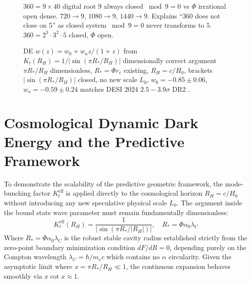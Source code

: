 \documentclass[11pt,a4paper]{article}
\begin{document}
\begin{figure}[H]\centering{}\caption{$360=9\times40$ digital root $9$ always closed $\bmod9=0$ vs $\Phi$ irrational open dense. $720\to9$, $1080\to9$, $1440\to9$. Explains ``360 does not close on 5'' as closed system $\bmod9=0$ never transforms to $5$. $360=2^3\cdot3^2\cdot5$ closed, $\Phi$ open.}\end{figure}

\begin{figure}[H]\centering{}\caption{DE $w(z)=w_0+w_a z/(1+z)$ from $K_t(R_H)=1/|\sin(\pi R_*/R_H)|$ dimensionally correct argument $\pi R_*/R_H$ dimensionless, $R_*=\Phi r_e$ existing, $R_H=c/H_0$, brackets $|\sin(\pi R_*/R_H)|$ closed, no new scale $L_0$, $w_0=-0.85\pm0.06$, $w_a=-0.59\pm0.24$ matches DESI 2024 $2.5-3.9\sigma$ \cite{DESI2024} DR2 \cite{DESI2025}.}\end{figure}

\section{Cosmological Dynamic Dark Energy and the Predictive Framework}
To demonstrate the scalability of the predictive geometric framework, the mode-bunching factor $K^{\text{eff}}_t$ is applied directly to the cosmological horizon $R_H = c/H_0$ without introducing any new speculative physical scale $L_0$. The argument inside the bound state wave parameter must remain fundamentally dimensionless:
\begin{equation}
K^{\text{eff}}_t(R_H) = \frac{1}{|\sin(\pi R_*/|R_H|)|}, \quad R_* = \Phi \alpha_0 \lambda_C
\end{equation}
Where $R_* = \Phi \alpha_0 \lambda_C$ is the robust stable cavity radius established strictly from the zero-point boundary minimization condition $dF/dR = 0$, depending purely on the Compton wavelength $\lambda_C = \hbar/m_e c$ which contains no $\alpha$ circularity. Given the asymptotic limit where $x = \pi R_*/R_H \ll 1$, the continuous expansion behaves smoothly via $x \cot x \approx 1$. 
\end{document}
